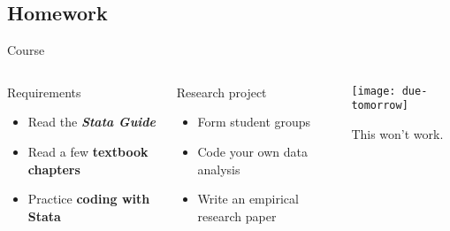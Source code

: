 \documentclass[t]{beamer}
\begin{document}
  \subsection{Homework}


  \begin{frame}[t]{Course }

  \begin{columns}[T]


    \begin{block}{Requirements}
      \begin{itemize}
        \item Read the \textbf{\emph{Stata Guide}}
        \item Read a few \textbf{textbook chapters}
        \item Practice \textbf{coding with Stata}
      \end{itemize}
    \end{block}

    \begin{alertblock}{Research project}
      \begin{itemize}
        \item Form student groups
        \item Code your own data analysis
        \item Write an empirical research paper
      \end{itemize}
    \end{alertblock}


    \begin{center}
      \texttt{[image: due-tomorrow]}\vspace{1em}

      This won't work.
    \end{center}

  \end{columns}

  \end{frame}
\end{document}
